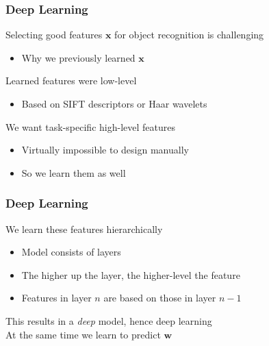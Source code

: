 \documentclass[xetex,professionalfont]{beamer}
\renewcommand{\vec}[1]{\ensuremath{\mathbf{#1}}}
\newcommand{\vw}{\vec{w}}
\newcommand{\vx}{\vec{x}}
\renewcommand\emph[1]{\textcolor{tuwcvl_inf_red}{#1}}
\begin{document}

{
\begin{frame}


\end{frame}
}


\begin{frame}
\frametitle{Deep Learning}

Selecting good features $\vx$ for object recognition is challenging
\begin{itemize}
    \item Why we previously learned $\vx$
\end{itemize}

\bigskip
Learned features were low-level
\begin{itemize}
    \item Based on SIFT descriptors or Haar wavelets
\end{itemize}

\bigskip
We want task-specific high-level features
\begin{itemize}
    \item Virtually impossible to design manually
    \item So we learn them as well
\end{itemize}

\end{frame}


\begin{frame}
\frametitle{Deep Learning}

We learn these features hierarchically
\begin{itemize}
    \item Model consists of layers
    \item The higher up the layer, the higher-level the feature
    \item Features in layer $n$ are based on those in layer $n-1$
\end{itemize}

\bigskip
This results in a \textit{deep} model, hence \emph{deep learning} \\
At the same time we learn to predict $\vw$

\end{frame}
\end{document}
